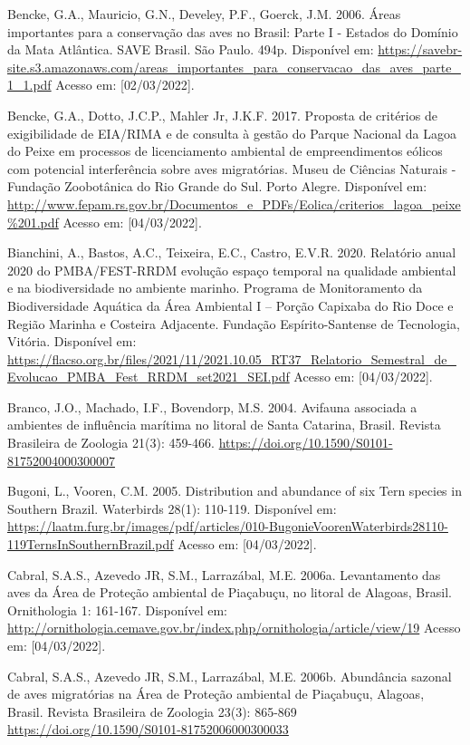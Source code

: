 \documentclass[
  oneside]{scrbook}
\begin{document}
Bencke, G.A., Mauricio, G.N., Develey, P.F., Goerck, J.M. 2006. Áreas importantes para a conservação das aves no Brasil: Parte I - Estados do Domínio da Mata Atlântica. SAVE Brasil. São Paulo. 494p. Disponível em: \url{https://savebr-site.s3.amazonaws.com/areas_importantes_para_conservacao_das_aves_parte_1_1.pdf} Acesso em: {[}02/03/2022{]}.

Bencke, G.A., Dotto, J.C.P., Mahler Jr, J.K.F. 2017. Proposta de critérios de exigibilidade de EIA/RIMA e de consulta à gestão do Parque Nacional da Lagoa do Peixe em processos de licenciamento ambiental de empreendimentos eólicos com potencial interferência sobre aves migratórias. Museu de Ciências Naturais - Fundação Zoobotânica do Rio Grande do Sul. Porto Alegre. Disponível em: \url{http://www.fepam.rs.gov.br/Documentos_e_PDFs/Eolica/criterios_lagoa_peixe\%201.pdf} Acesso em: {[}04/03/2022{]}.

Bianchini, A., Bastos, A.C., Teixeira, E.C., Castro, E.V.R. 2020. Relatório anual 2020 do PMBA/FEST-RRDM evolução espaço temporal na qualidade ambiental e na biodiversidade no ambiente marinho. Programa de Monitoramento da Biodiversidade Aquática da Área Ambiental I -- Porção Capixaba do Rio Doce e Região Marinha e Costeira Adjacente. Fundação Espírito-Santense de Tecnologia, Vitória. Disponível em: \url{https://flacso.org.br/files/2021/11/2021.10.05_RT37_Relatorio_Semestral_de_Evolucao_PMBA_Fest_RRDM_set2021_SEI.pdf} Acesso em: {[}04/03/2022{]}.

Branco, J.O., Machado, I.F., Bovendorp, M.S. 2004. Avifauna associada a ambientes de influência marítima no litoral de Santa Catarina, Brasil. Revista Brasileira de Zoologia 21(3): 459-466. \url{https://doi.org/10.1590/S0101-81752004000300007}

Bugoni, L., Vooren, C.M. 2005. Distribution and abundance of six Tern species in Southern Brazil. Waterbirds 28(1): 110-119. Disponível em: \url{https://laatm.furg.br/images/pdf/articles/010-BugonieVoorenWaterbirds28110-119TernsInSouthernBrazil.pdf} Acesso em: {[}04/03/2022{]}.

Cabral, S.A.S., Azevedo JR, S.M., Larrazábal, M.E. 2006a. Levantamento das aves da Área de Proteção ambiental de Piaçabuçu, no litoral de Alagoas, Brasil. Ornithologia 1: 161-167. Disponível em: \url{http://ornithologia.cemave.gov.br/index.php/ornithologia/article/view/19} Acesso em: {[}04/03/2022{]}.

Cabral, S.A.S., Azevedo JR, S.M., Larrazábal, M.E. 2006b. Abundância sazonal de aves migratórias na Área de Proteção ambiental de Piaçabuçu, Alagoas, Brasil. Revista Brasileira de Zoologia 23(3): 865-869 \url{https://doi.org/10.1590/S0101-81752006000300033}
\end{document}
